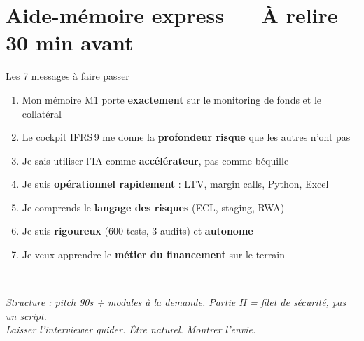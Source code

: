 \documentclass[11pt,a4paper]{article}
\begin{document}
\vspace{10pt}

\section{Aide-m\'emoire express --- \`A relire 30 min avant}

\begin{goodbox}{Les 7 messages \`a faire passer}
\begin{enumerate}[nosep, leftmargin=16pt]
\item Mon m\'emoire M1 porte \textbf{exactement} sur le monitoring de fonds et le collat\'eral
\item Le cockpit IFRS\,9 me donne la \textbf{profondeur risque} que les autres n'ont pas
\item Je sais utiliser l'IA comme \textbf{acc\'el\'erateur}, pas comme b\'equille
\item Je suis \textbf{op\'erationnel rapidement} : LTV, margin calls, Python, Excel
\item Je comprends le \textbf{langage des risques} (ECL, staging, RWA)
\item Je suis \textbf{rigoureux} (600 tests, 3 audits) et \textbf{autonome}
\item Je veux apprendre le \textbf{m\'etier du financement} sur le terrain
\end{enumerate}
\end{goodbox}

\vspace{12pt}

\begin{center}
\textcolor{warmgray}{\rule{0.4\textwidth}{0.5pt}}\\[6pt]
\textcolor{warmgray}{\small\textit{Structure : pitch 90s + modules \`a la demande.
Partie II = filet de s\'ecurit\'e, pas un script.\\
Laisser l'interviewer guider. \^Etre naturel. Montrer l'envie.}}
\end{center}
\end{document}
